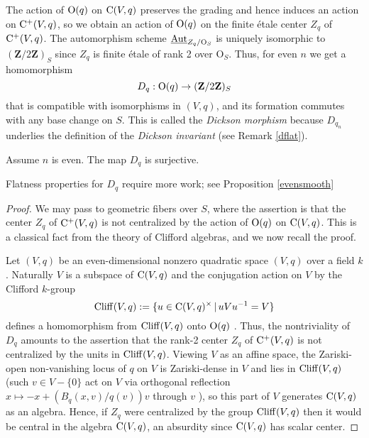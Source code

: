 \documentclass[10pt]{article}
\renewcommand{\O}{\mathscr{O}}
\renewcommand{\(}{\left(}
\renewcommand{\)}{\right)}
\renewcommand{\O}{\mathrm{O}}
\numberwithin{thm}{subsection}
\begin{document}
The action of 
${\rm{O}}(q)$ on ${\rm{C}}(V,q)$ preserves the grading and hence
induces an action on ${\rm{C}}^+(V,q)$, so we obtain an action of ${\rm{O}}(q)$ 
on the finite \'etale center $Z_q$
of ${\rm{C}}^+(V,q)$.  The automorphism scheme $\underline{\rm{Aut}}_{Z_q/\O_S}$ is
uniquely isomorphic to $({\mathbf{Z}}/2{\mathbf{Z}})_S$ since $Z_q$ is finite \'etale 
of rank 2 over $\O_S$. Thus, for even $n$ we get a homomorphism
$$D_q:{\rm{O}}(q) \rightarrow ({\mathbf{Z}}/2{\mathbf{Z}})_S$$
that is compatible with isomorphisms in $(V,q)$, and its
formation commutes with any base change on $S$.
This is called the {\em Dickson morphism} because $D_{q_n}$ underlies the definition
of the {\em Dickson invariant} (see Remark \ref{dflat}). 

 \begin{prop}\label{disconnok}
 Assume $n$ is even. The map $D_q$
 is surjective.
  \end{prop}
 
Flatness properties for $D_q$ require more work; see Proposition \ref{evensmooth}
  
 \begin{proof}
We may pass to geometric fibers over $S$, where the assertion
is that the center $Z_q$ of ${\rm{C}}^+(V,q)$ is not centralized
by the action of ${\rm{O}}(q)$ on ${\rm{C}}(V,q)$.
This is a classical fact from the theory of Clifford algebras,
and we now recall the proof.

Let $(V,q)$ be an even-dimensional 
nonzero quadratic space $(V,q)$ over a field $k$.  Naturally 
$V$ is a subspace of ${\rm{C}}(V,q)$
and the conjugation action on $V$ by the Clifford $k$-group 
$${\rm{Cliff}}(V,q) := \{ u \in {\rm{C}}(V,q)^{\times}\,|\,uVu^{-1} = V\}$$
defines a homomorphism from 
${\rm{Cliff}}(V,q)$ onto ${\rm{O}}(q)$ \cite[IX, \S9.5, Thm.\,4(a)]{balg}. Thus, the nontriviality
of $D_q$ amounts to the assertion that the rank-2 center $Z_q$ of
${\rm{C}}^+(V,q)$ is not centralized by the units in ${\rm{Cliff}}(V,q)$.  
Viewing $V$ as an affine
space, the Zariski-open non-vanishing locus of $q$ on $V$ is Zariski-dense in $V$
and lies in ${\rm{Cliff}}(V,q)$ (such $v \in V - \{0\}$ act on $V$
via orthogonal reflection $x \mapsto -x + (B_q(x,v)/q(v))v$ through $v$
\cite[IX, \S9.5, Thm.\,4(b)]{balg}), so this part of $V$  generates
${\rm{C}}(V,q)$ as an algebra.  Hence, if $Z_q$ were centralized by
the group ${\rm{Cliff}}(V,q)$ then it would be central in the algebra ${\rm{C}}(V,q)$,
an absurdity since ${\rm{C}}(V,q)$ has scalar center.  
\end{proof}
\end{document}
